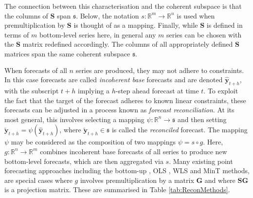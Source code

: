 \documentclass[12pt]{article}
\theoremstyle{definition}
\begin{document}
The connection between this characterisation and the coherent subspace is that the columns of $\bm{S}$ span $\mathfrak{s}$.  Below, the notation $s:\mathbb{R}^m\rightarrow\mathbb{R}^n$ is used when premultiplication by $\bm{S}$ is thought of as a mapping.  Finally, while $\bm{S}$ is defined in terms of $m$ bottom-level series here, in general any $m$ series can be chosen with the $\bm{S}$ matrix redefined accordingly.  The columns of all appropriately defined $\bm{S}$ matrices span the same coherent subspace $\mathfrak{s}$.

When forecasts of all $n$ series are produced, they may not adhere to constraints.  In this case forecasts are called {\em incoherent base} forecasts and are denoted $\hat{\bm y}_{t+h}$, with the subscript $t+h$ implying a $h$-step ahead forecast at time $t$.  To exploit the fact that the target of the forecast adheres to known linear constraints, these forecasts can be adjusted in a process known as {\em forecast reconciliation}.  At its most general, this involves selecting a mapping $\psi:\mathbb{R}^n\rightarrow\mathfrak{s}$ and then setting $\tilde{\bm y}_{t+h}=\psi(\hat{\bm y}_{t+h})$, where $\tilde{\bm y}_{t+h}\in\mathfrak{s}$ is called the {\em reconciled} forecast.  The mapping $\psi$ may be considered as the composition of two mappings $\psi=s\circ g$. Here, $g:\mathbb{R}^{n}\rightarrow\mathbb{R}^{m}$ combines incoherent base forecasts of all series to produce new bottom-level forecasts, which are then aggregated via $s$.  Many existing point forecasting approaches including the bottom-up \citep{Dunn1976}, OLS \citep{HynEtAl2011}, WLS \citep[][]{Hyndman2016,AthEtAl2017} and MinT \citep{WicEtAl2019} methods, are special cases where $g$ involves premultiplication by a matrix $\bm{G}$ and where $\bm{S}\bm{G}$ is a projection matrix. These are summarised in Table \ref{tab:ReconMethods}.
\end{document}
